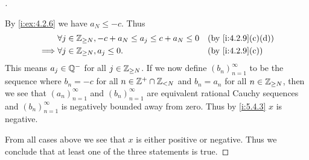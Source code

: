\begin{proof}[]
\begin{itemize}
          By \cref{i:ex:4.2.6} we have \(a_N \leq -c\).
          Thus
          \begin{align*}
                     & \forall j \in \Z_{\geq N}, -c + a_N \leq a_j \leq c + a_N \leq 0 &  & \by{i:4.2.9}[c,d] \\
            \implies & \forall j \in \Z_{\geq N}, a_j \leq 0.                           &  & \by{i:4.2.9}[c]
          \end{align*}
          This means \(a_j \in \mathbb{Q}^-\) for all \(j \in \mathbb{Z}_{\geq N}\).
          If we now define \((b_n)_{n = 1}^\infty\) to be the sequence where \(b_n = -c\) for all \(n \in \mathbb{Z}^+ \cap \mathbb{Z}_{< N}\) and \(b_n = a_n\) for all \(n \in \mathbb{Z}_{\geq N}\), then we see that \((a_n)_{n = 1}^\infty\) and \((b_n)_{n = 1}^\infty\) are equivalent rational Cauchy sequences and \((b_n)_{n = 1}^\infty\) is negatively bounded away from zero.
          Thus by \cref{i:5.4.3} \(x\) is negative.
  \end{itemize}
  From all cases above we see that \(x\) is either positive or negative.
  Thus we conclude that at least one of the three statements is true.


\end{proof}

